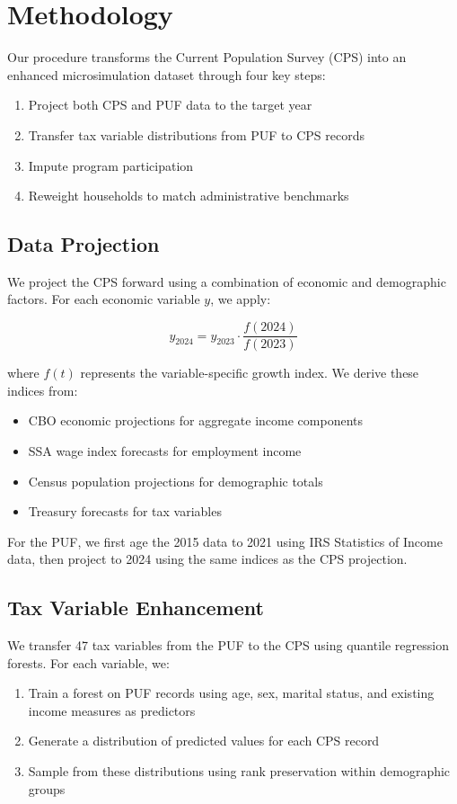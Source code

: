 \section{Methodology}

Our procedure transforms the Current Population Survey (CPS) into an enhanced microsimulation dataset through four key steps:
\begin{enumerate}
    \item Project both CPS and PUF data to the target year
    \item Transfer tax variable distributions from PUF to CPS records
    \item Impute program participation
    \item Reweight households to match administrative benchmarks
\end{enumerate}

\subsection{Data Projection}

We project the CPS forward using a combination of economic and demographic factors. For each economic variable $y$, we apply:

\[ y_{2024} = y_{2023} \cdot \frac{f(2024)}{f(2023)} \]

where $f(t)$ represents the variable-specific growth index. We derive these indices from:
\begin{itemize}
    \item CBO economic projections for aggregate income components
    \item SSA wage index forecasts for employment income
    \item Census population projections for demographic totals
    \item Treasury forecasts for tax variables
\end{itemize}

For the PUF, we first age the 2015 data to 2021 using IRS Statistics of Income data, then project to 2024 using the same indices as the CPS projection.

\subsection{Tax Variable Enhancement}

We transfer 47 tax variables from the PUF to the CPS using quantile regression forests. For each variable, we:
\begin{enumerate}
    \item Train a forest on PUF records using age, sex, marital status, and existing income measures as predictors
    \item Generate a distribution of predicted values for each CPS record
    \item Sample from these distributions using rank preservation within demographic groups
\end{enumerate}

